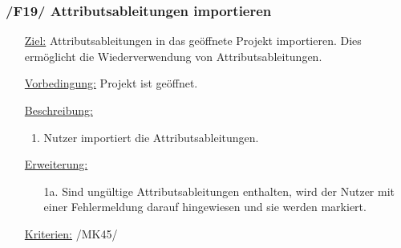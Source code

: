 \documentclass{article}
\begin{document}
\subsubsection*{\textbf{/F19/} Attributsableitungen importieren}
\label{sec:f:Attributsableitungen importieren}
\begin{itemize}
    \item[\underline{Ziel:}] Attributsableitungen in das geöffnete Projekt importieren. Dies ermöglicht die Wiederverwendung von Attributsableitungen.
    \item[\underline{Vorbedingung:}] Projekt ist geöffnet.
    \item[\underline{Beschreibung:}]
    \begin{enumerate}
        \item Nutzer importiert die Attributsableitungen. 
    \end{enumerate}
    \item[\underline{Erweiterung:}]
    \begin{itemize}
        \item[1a.] Sind ungültige Attributsableitungen enthalten, wird der Nutzer mit einer Fehlermeldung darauf hingewiesen und sie werden markiert. 
    \end{itemize}
    \item[\underline{Kriterien:}] /MK45/
\end{itemize}
\end{document}
